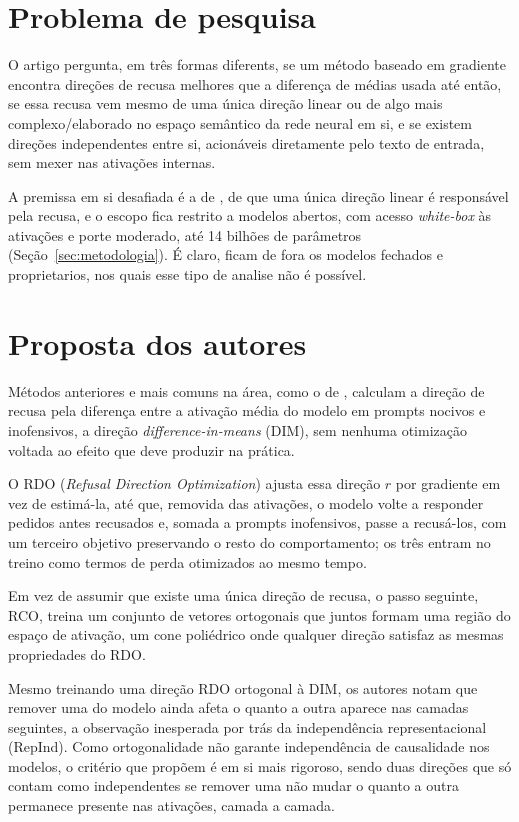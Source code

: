 \documentclass[article,11pt,oneside,a4paper,brazil,section=TITLE]{setup/abntex2}
\begin{document}
\section{Problema de pesquisa}

O artigo pergunta, em três formas diferents, se um método baseado em gradiente encontra direções de recusa melhores que a diferença de médias usada até então, se essa recusa vem mesmo de uma única direção linear ou de algo mais complexo/elaborado no espaço semântico da rede neural em si, e se existem direções independentes entre si, acionáveis diretamente pelo texto de entrada, sem mexer nas ativações internas.

A premissa em si desafiada é a de \textcite{arditi2024refusal}, de que uma única direção linear é responsável pela recusa, e o escopo fica restrito a modelos abertos, com acesso \emph{white-box} às ativações e porte moderado, até 14 bilhões de parâmetros (Seção~\ref{sec:metodologia}). É claro, ficam de fora os modelos fechados e proprietarios, nos quais esse tipo de analise não é possível.

\section{Proposta dos autores}
\label{sec:proposta}

Métodos anteriores e mais comuns na área, como o de \textcite{arditi2024refusal}, calculam a direção de recusa pela diferença entre a ativação média do modelo em prompts nocivos e inofensivos, a direção \emph{difference-in-means} (DIM), sem nenhuma otimização voltada ao efeito que deve produzir na prática.

O RDO (\emph{Refusal Direction Optimization}) ajusta essa direção $r$ por gradiente em vez de estimá-la, até que, removida das ativações, o modelo volte a responder pedidos antes recusados e, somada a prompts inofensivos, passe a recusá-los, com um terceiro objetivo preservando o resto do comportamento; os três entram no treino como termos de perda otimizados ao mesmo tempo.

Em vez de assumir que existe uma única direção de recusa, o passo seguinte, RCO, treina um conjunto de vetores ortogonais que juntos formam uma região do espaço de ativação, um cone poliédrico onde qualquer direção satisfaz as mesmas propriedades do RDO.

Mesmo treinando uma direção RDO ortogonal à DIM, os autores notam que remover uma do modelo ainda afeta o quanto a outra aparece nas camadas seguintes, a observação inesperada por trás da independência representacional (RepInd). Como ortogonalidade não garante independência de causalidade nos modelos, o critério que propõem é em si mais rigoroso, sendo duas direções que só contam como independentes se remover uma não mudar o quanto a outra permanece presente nas ativações, camada a camada.
\end{document}
